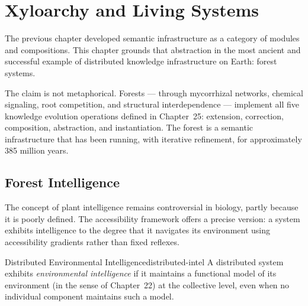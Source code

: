 
\chapter{Xyloarchy and Living Systems}



The previous chapter developed semantic infrastructure as a category of
modules and compositions. This chapter grounds that abstraction in the
most ancient and successful example of distributed knowledge infrastructure
on Earth: forest systems.

The claim is not metaphorical. Forests — through mycorrhizal networks,
chemical signaling, root competition, and structural interdependence —
implement all five knowledge evolution operations defined in Chapter~25:
extension, correction, composition, abstraction, and instantiation.
The forest is a semantic infrastructure that has been running, with
iterative refinement, for approximately 385 million years.

\section{Forest Intelligence}

The concept of plant intelligence remains controversial in biology,
partly because it is poorly defined. The accessibility framework offers
a precise version: a system exhibits intelligence to the degree that
it navigates its environment using accessibility gradients rather than
fixed reflexes.

\begin{definition}{Distributed Environmental Intelligence}{distributed-intel}
  A distributed system exhibits \emph{environmental intelligence} if
  it maintains a functional model of its environment (in the sense of
  Chapter~22) at the collective level, even when no individual component
  maintains such a model.
\end{definition}

